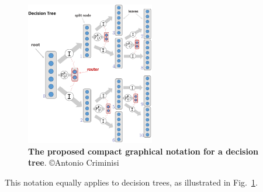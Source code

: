 \documentclass[thesis]{subfiles}
\begin{document}
\begin{figure}[htbp!] 
\centering
\includegraphics[width=0.5\textwidth]{decisionTree.png}
\caption[New graphical notation for a binary decision tree.]{{\bf The proposed compact graphical notation for a decision tree}. \copyright Antonio Criminisi}
\label{fig:decisionTree}
\end{figure}

This notation equally applies to decision trees, as illustrated in Fig.~\ref{fig:decisionTree}.
\end{document}

